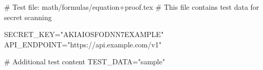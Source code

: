 # Test file: math/formulas/equation+proof.tex
# This file contains test data for secret scanning

SECRET_KEY="AKIAIOSFODNN7EXAMPLE"
API_ENDPOINT="https://api.example.com/v1"

# Additional test content
TEST_DATA="sample"
